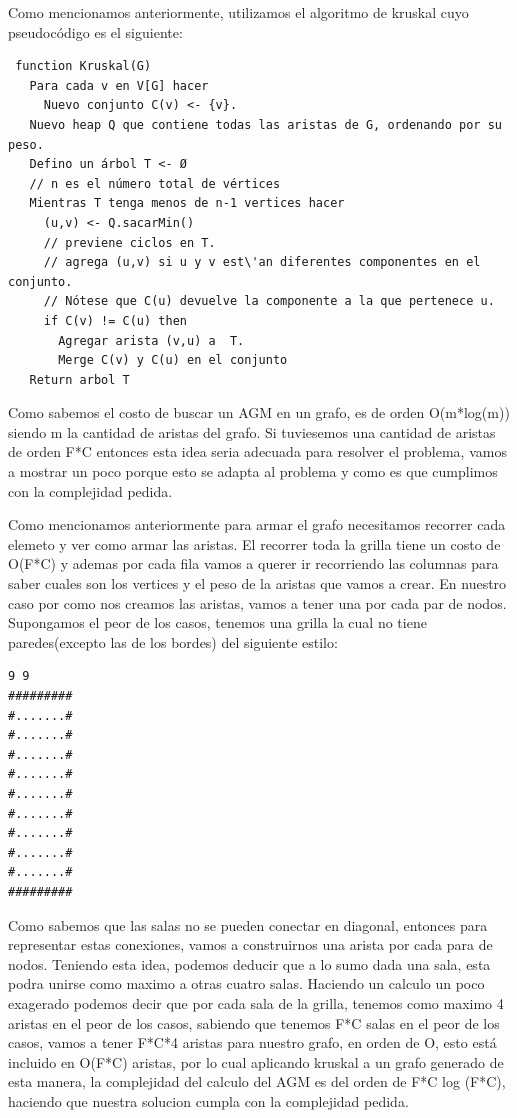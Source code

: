 Como mencionamos anteriormente, utilizamos el algoritmo de kruskal cuyo pseudocódigo es el siguiente:

\begin{verbatim}
 function Kruskal(G)
   Para cada v en V[G] hacer
     Nuevo conjunto C(v) <- {v}.
   Nuevo heap Q que contiene todas las aristas de G, ordenando por su peso.
   Defino un árbol T <- Ø     
   // n es el número total de vértices
   Mientras T tenga menos de n-1 vertices hacer
     (u,v) <- Q.sacarMin()
     // previene ciclos en T.
     // agrega (u,v) si u y v est\'an diferentes componentes en el conjunto. 
     // Nótese que C(u) devuelve la componente a la que pertenece u.
     if C(v) != C(u) then
       Agregar arista (v,u) a  T.
       Merge C(v) y C(u) en el conjunto
   Return arbol T 
\end{verbatim}


Como sabemos el costo de buscar un AGM en un grafo, es de orden O(m*log(m)) siendo m la cantidad de aristas del grafo. Si tuviesemos una cantidad de aristas de orden F*C entonces esta idea seria adecuada para resolver el problema, vamos a mostrar un poco porque esto se adapta al problema y como es que cumplimos con la complejidad pedida.

Como mencionamos anteriormente para armar el grafo necesitamos recorrer cada elemeto y ver como armar las aristas. El recorrer toda la grilla tiene un costo de O(F*C)
y ademas por cada fila vamos a querer ir recorriendo las columnas para saber cuales son los vertices y el peso de la aristas que vamos a crear.
En nuestro caso por como nos creamos las aristas, vamos a tener una por cada par de nodos.
Supongamos el peor de los casos, tenemos una grilla la cual no tiene paredes(excepto las de los bordes) del siguiente estilo:

\begin{verbatim}
9 9
#########
#.......#
#.......#
#.......#
#.......#
#.......#
#.......#
#.......#
#.......#
#.......#
#########
\end{verbatim}
Como sabemos que las salas no se pueden conectar en diagonal, entonces para representar estas conexiones, vamos a construirnos una arista por cada para de nodos. Teniendo esta idea, podemos deducir que a lo sumo dada una sala, esta podra unirse como maximo a otras cuatro salas.
Haciendo un calculo un poco exagerado podemos decir que por cada sala de la grilla, tenemos como maximo 4 aristas en el peor de los casos, sabiendo que tenemos F*C salas en el peor de los casos, vamos a tener F*C*4 aristas para nuestro grafo, en orden de O, esto está incluido en O(F*C) aristas, por lo cual aplicando kruskal a un grafo generado de esta manera, la complejidad del calculo del AGM es del orden de F*C log (F*C), haciendo que nuestra solucion cumpla con la complejidad pedida.

